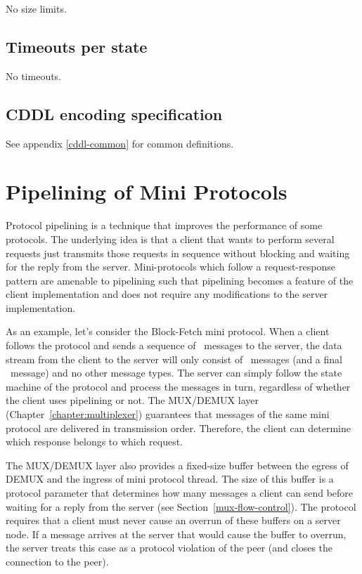 No size limits.

\subsection{Timeouts per state}

No timeouts.

\subsection{CDDL encoding specification}

See appendix \ref{cddl-common} for common definitions.

\section{Pipelining of Mini Protocols}
\label{pipelining}
Protocol pipelining is a technique that improves the performance of some protocols.
The underlying idea is that a client that wants to perform several requests
just transmits those requests in sequence without blocking and waiting for the reply from the server.
Mini-protocols which follow a request-response pattern are amenable to pipelining
such that pipelining becomes a feature of the client implementation and does not
require any modifications to the server implementation.

As an example, let's consider the Block-Fetch mini protocol.
When a client follows the protocol and sends a sequence of \MsgRequestRange{}~messages to the server, the data stream from the client to the server will only consist of \MsgRequestRange~messages
(and a final \MsgClientDone~message) and no other message types.
The server can simply follow the state machine of the protocol and process the messages in turn,
regardless of whether the client uses pipelining or not.
The MUX/DEMUX layer (Chapter~\ref{chapter:multiplexer}) guarantees
that messages of the same mini protocol are delivered in transmission order.
Therefore, the client can determine which response belongs to which request.

The MUX/DEMUX layer also provides a fixed-size buffer between the egress of DEMUX and the ingress
of mini protocol thread.
The size of this buffer is a protocol parameter that determines how many messages
a client can send before waiting for a reply from the server (see Section~\ref{mux-flow-control}).
The protocol requires that a client must never cause an overrun of these buffers on a server node.
If a message arrives at the server that would cause the buffer to overrun,
the server treats this case as a protocol violation of the peer
(and closes the connection to the peer).


